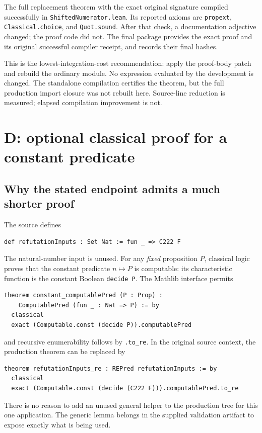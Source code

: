 \documentclass[11pt,a4paper]{article}
\newcommand{\code}[1]{\texttt{\small #1}}
\begin{document}
The full replacement theorem with the exact original signature compiled successfully in \code{ShiftedNumerator.lean}. Its reported axioms are \code{propext}, \code{Classical.choice}, and \code{Quot.sound}. After that check, a documentation adjective changed; the proof code did not. The final package provides the exact proof and its original successful compiler receipt, and records their final hashes.

This is the lowest-integration-cost recommendation: apply the proof-body patch and rebuild the ordinary module. No expression evaluated by the development is changed. The standalone compilation certifies the theorem, but the full production import closure was not rebuilt here. Source-line reduction is measured; elapsed compilation improvement is not.

\section{D: optional classical proof for a constant predicate}

\subsection{Why the stated endpoint admits a much shorter proof}

The source defines
\begin{lstlisting}
def refutationInputs : Set Nat := fun _ => C222 F
\end{lstlisting}
The natural-number input is unused. For any \emph{fixed} proposition $P$, classical logic proves that the constant predicate $n\mapsto P$ is computable: its characteristic function is the constant Boolean \code{decide P}. The Mathlib interface permits
\begin{lstlisting}
theorem constant_computablePred (P : Prop) :
    ComputablePred (fun _ : Nat => P) := by
  classical
  exact (Computable.const (decide P)).computablePred
\end{lstlisting}
and recursive enumerability follows by \code{.to\_re}. In the original source context, the production theorem can be replaced by
\begin{lstlisting}
theorem refutationInputs_re : REPred refutationInputs := by
  classical
  exact (Computable.const (decide (C222 F))).computablePred.to_re
\end{lstlisting}
There is no reason to add an unused general helper to the production tree for this one application. The generic lemma belongs in the supplied validation artifact to expose exactly what is being used.
\end{document}
